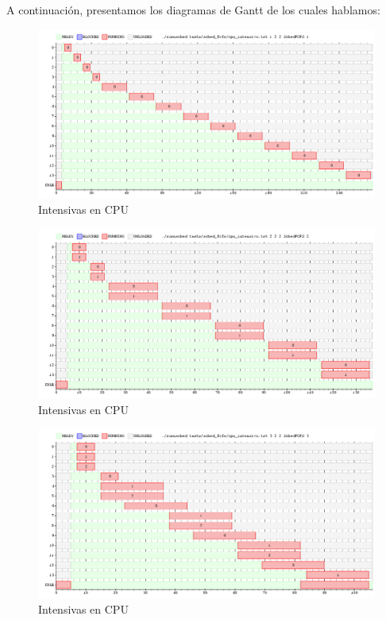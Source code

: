 \documentclass[11pt, a4paper, twoside]{article}
\begin{document}
A continuación, presentamos los diagramas de Gantt de los cuales hablamos: 

\begin{figure}[H]
  \includegraphics [width=\textwidth]{../graficos/sched_fcfs/cpu_intensivo.png}
  \caption{Intensivas en CPU}
\end{figure}
\begin{figure}[H]
  \includegraphics [width=\textwidth]{../graficos/sched_fcfs/cpu_intensivo2.png}
  \caption{Intensivas en CPU}
\end{figure}
\begin{figure}[H]
  \includegraphics [width=\textwidth]{../graficos/sched_fcfs/cpu_intensivo3.png}
  \caption{Intensivas en CPU}
\end{figure}
\end{document}

